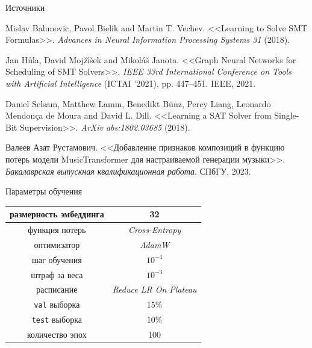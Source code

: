 \documentclass[14pt,aspectratio=169,hyperref={pdftex,unicode},xcolor=dvipsnames]{beamer}
\begin{document}
\begin{frame}{Источники}
\begin{thebibliography}{1}
 Mislav Balunovic, Pavol Bielik and Martin T. Vechev. <<Learning to Solve SMT Formulas>>. \textit{Advances in Neural Information Processing Systems 31} (2018).

 Jan H\r{u}la, David Moj\v{z}\'{\i}\v{s}ek and Mikol\'{a}\v{s} Janota. <<Graph Neural Networks for Scheduling of SMT Solvers>>. \textit{IEEE 33rd International Conference on Tools with Artificial Intelligence} (ICTAI '2021), pp. 447--451. IEEE, 2021.

 Daniel Selsam, Matthew Lamm, Benedikt B\"{u}nz, Percy Liang, Leonardo Mendonça de Moura and David L. Dill. <<Learning a SAT Solver from Single-Bit Supervision>>. \textit{ArXiv abs:1802.03685} (2018).

 Валеев Азат Рустамович. <<Добавление признаков композиций в функцию потерь модели MusicTransformer для настраиваемой генерации музыки>>. \textit{Бакалаврская выпускная квалификационная работа}. СПбГУ, 2023.

\end{thebibliography}

\end{frame}



\begin{frame}[noframenumbering]{Параметры обучения}

\begin{table}[ht]
\begin{center}
\begin{tabular}{cc}
  \hline
  размерность эмбеддинга & 32 \\
  \hline
  функция потерь         & \textit{Cross-Entropy} \\
  оптимизатор            & \textit{AdamW} \\
  шаг обучения           & $10^{-4}$ \\
  штраф за веса          & $10^{-3}$ \\
  расписание             & \textit{Reduce LR On Plateau} \\
  \hline
  \texttt{val} выборка   & 15\% \\
  \texttt{test} выборка  & 10\% \\
  количество эпох        & 100
\end{tabular}
\end{center}
\end{table}

\end{frame}
\end{document}
